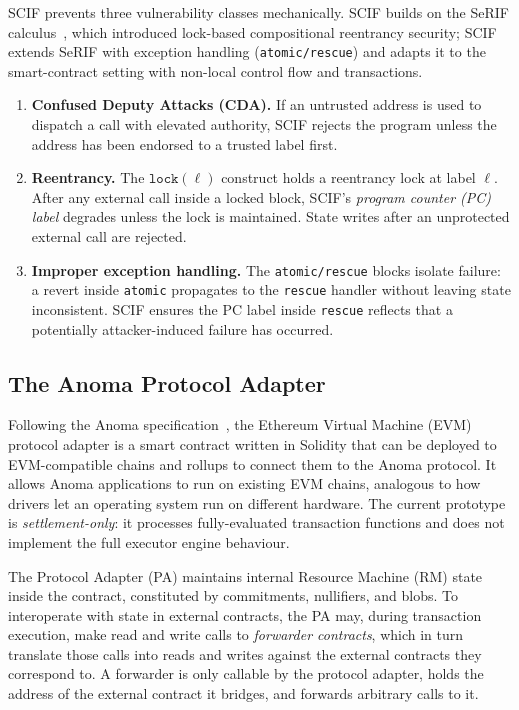 \documentclass[11pt,a4paper]{article}
\begin{document}
SCIF prevents three vulnerability classes mechanically. SCIF builds on the
SeRIF calculus~\cite{serif2021}, which introduced lock-based compositional
reentrancy security; SCIF extends SeRIF with exception handling
(\texttt{atomic/rescue}) and adapts it to the smart-contract setting with
non-local control flow and transactions.
\begin{enumerate}
  \item \textbf{Confused Deputy Attacks (CDA).} If an untrusted address is used
    to dispatch a call with elevated authority, SCIF rejects the program unless
    the address has been endorsed to a trusted label first.
  \item \textbf{Reentrancy.} The $\texttt{lock}(\ell)$ construct holds a
    reentrancy lock at label $\ell$. After any external call inside a locked
    block, SCIF's \emph{program counter (PC) label} degrades unless the lock is
    maintained. State writes after an unprotected external call are rejected.
  \item \textbf{Improper exception handling.} The \texttt{atomic/rescue} blocks
    isolate failure: a revert inside \texttt{atomic} propagates to the
    \texttt{rescue} handler without leaving state inconsistent. SCIF ensures the
    PC label inside \texttt{rescue} reflects that a potentially attacker-induced
    failure has occurred.
\end{enumerate}

\subsection{The Anoma Protocol Adapter}

Following the Anoma specification~\cite{anomaspecs}, the Ethereum Virtual
Machine (EVM) protocol adapter is a smart contract written in Solidity that
can be deployed to EVM-compatible chains and rollups to connect them to the
Anoma protocol. It allows Anoma applications to run on existing EVM chains,
analogous to how drivers let an operating system run on different
hardware. The current prototype is \emph{settlement-only}: it processes
fully-evaluated transaction functions and does not implement the full executor
engine behaviour.

The Protocol Adapter (\textsf{PA}) maintains internal Resource Machine (RM)
state inside the contract, constituted by commitments, nullifiers, and blobs.
To interoperate with state in external contracts, the PA may, during
transaction execution, make read and write calls to \emph{forwarder
contracts}, which in turn translate those calls into reads and writes against
the external contracts they correspond to. A forwarder is only callable by the
protocol adapter, holds the address of the external contract it bridges, and
forwards arbitrary calls to it.
\end{document}
